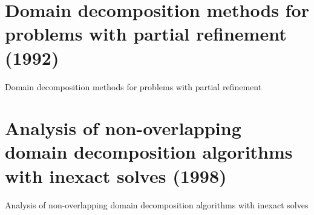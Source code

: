 \section{Domain decomposition methods for problems with partial refinement (1992)}
Domain decomposition methods for problems with partial refinement \cite{bramble1992domain}


\section{Analysis of non-overlapping domain decomposition algorithms with inexact solves (1998)}
Analysis of non-overlapping domain decomposition algorithms with inexact solves \cite{bramble1998analysis}


